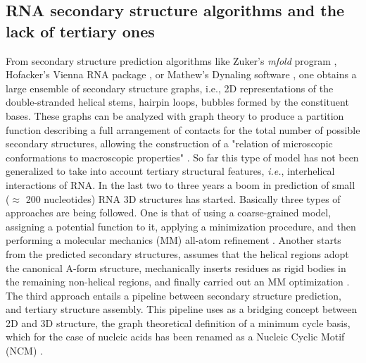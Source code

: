 \subsection{RNA secondary structure algorithms and the lack of tertiary ones}
From   secondary   structure   prediction  algorithms   like   Zuker's
\textit{mfold} program \cite{zuker2003}, Hofacker's Vienna RNA package
\cite{hofacker1994}, or Mathew's Dynaling software \cite{mathews2002},
one obtains a  large ensemble of secondary structure  graphs, i.e., 2D
representations of  the double-stranded helical  stems, hairpin loops,
bubbles formed by the constituent bases.  These graphs can be analyzed
with graph  theory to produce  a partition function describing  a full
arrangement  of contacts for  the total  number of  possible secondary
structures, allowing  the construction  of a "relation  of microscopic
conformations to macroscopic  properties" \cite{chen2000}. So far this
type of model  has not been generalized to  take into account tertiary
structural features, \textit{i.e.},  interhelical interactions of RNA.
In  the  last  two to  three  years  a  boom  in prediction  of  small
($\approx$ 200  nucleotides) RNA 3D structures  has started. Basically
three types of approaches are being  followed.  One is that of using a
coarse-grained model, assigning a potential function to it, applying a
minimization procedure, and then performing a molecular mechanics (MM)
all-atom  refinement \cite{das2007, ding2008,  jonikas2009a}.  Another
starts  from  the predicted  secondary  structures,  assumes that  the
helical  regions adopt  the canonical  A-form  structure, mechanically
inserts residues as rigid bodies in the remaining non-helical regions,
and finally  carried out an MM  optimization \cite{martinez2008}.  The
third  approach   entails  a  pipeline   between  secondary  structure
prediction, and tertiary structure  assembly.  This pipeline uses as a
bridging concept  between 2D and  3D structure, the  graph theoretical
definition of  a minimum  cycle basis, which  for the case  of nucleic
acids   has   been  renamed   as   a   Nucleic   Cyclic  Motif   (NCM)
\cite{parisien2008}.

